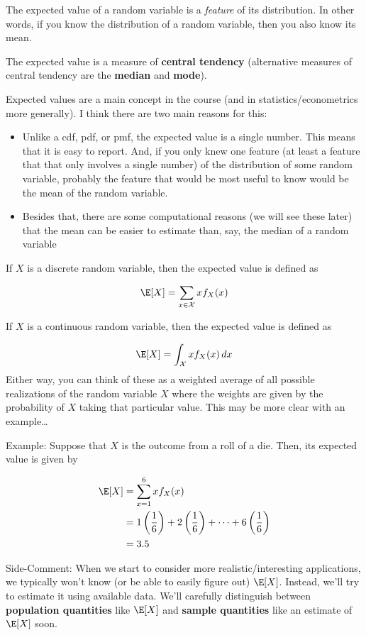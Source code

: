 \documentclass[
  letterpaper,
  DIV=11,
  numbers=noendperiod]{scrreprt}
\begin{document}
The expected value of a random variable is a \emph{feature} of its
distribution. In other words, if you know the distribution of a random
variable, then you also know its mean.

The expected value is a measure of \textbf{central tendency}
(alternative measures of central tendency are the \textbf{median} and
\textbf{mode}).

Expected values are a main concept in the course (and in
statistics/econometrics more generally). I think there are two main
reasons for this:

\begin{itemize}
\item
  Unlike a cdf, pdf, or pmf, the expected value is a single number. This
  means that it is easy to report. And, if you only knew one feature (at
  least a feature that that only involves a single number) of the
  distribution of some random variable, probably the feature that would
  be most useful to know would be the mean of the random variable.
\item
  Besides that, there are some computational reasons (we will see these
  later) that the mean can be easier to estimate than, say, the median
  of a random variable
\end{itemize}

If \(X\) is a discrete random variable, then the expected value is
defined as

\[
  \E[X] = \sum_{x \in \mathcal{X}} x f_X(x)
\]

If \(X\) is a continuous random variable, then the expected value is
defined as

\[
  \E[X] = \int_{\mathcal{X}} x f_X(x) \, dx
\] Either way, you can think of these as a weighted average of all
possible realizations of the random variable \(X\) where the weights are
given by the probability of \(X\) taking that particular value. This may
be more clear with an example\ldots{}

{Example: }Suppose that \(X\) is the outcome from a roll of a die. Then,
its expected value is given by

\[
  \begin{aligned}
  \E[X] &= \sum_{x=1}^6 x f_X(x) \\
  &= 1\left(\frac{1}{6}\right) + 2\left(\frac{1}{6}\right) + \cdots + 6\left(\frac{1}{6}\right) \\
  &= 3.5
  \end{aligned}
\]

{Side-Comment:} When we start to consider more realistic/interesting
applications, we typically won't know (or be able to easily figure out)
\(\E[X]\). Instead, we'll try to estimate it using available data. We'll
carefully distinguish between \textbf{population quantities} like
\(\E[X]\) and \textbf{sample quantities} like an estimate of \(\E[X]\)
soon.
\end{document}
